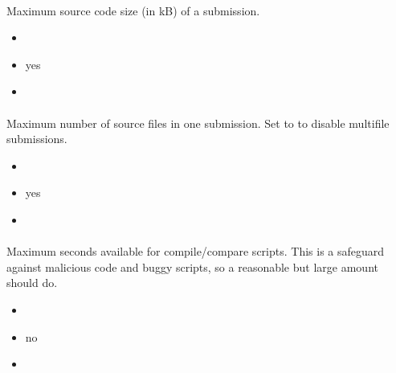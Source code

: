 \documentclass[a4paper,10pt,english,openany]{sphinxmanual}
\begin{document}
\paragraph{}
\label{\detokenize{configuration-reference:sourcesize-limit}}
\sphinxAtStartPar
Maximum source code size (in kB) of a submission.
\begin{itemize}
\item {} 
\sphinxAtStartPar
{} 

\item {} 
\sphinxAtStartPar
{} yes

\item {} 
\sphinxAtStartPar
{} 

\end{itemize}


\paragraph{}
\label{\detokenize{configuration-reference:sourcefiles-limit}}
\sphinxAtStartPar
Maximum number of source files in one submission. Set to  to disable multi\sphinxhyphen{}file submissions.
\begin{itemize}
\item {} 
\sphinxAtStartPar
{} 

\item {} 
\sphinxAtStartPar
{} yes

\item {} 
\sphinxAtStartPar
{} 

\end{itemize}


\paragraph{}
\label{\detokenize{configuration-reference:script-timelimit}}
\sphinxAtStartPar
Maximum seconds available for compile/compare scripts. This is a safeguard against malicious code and buggy scripts, so a reasonable but large amount should do.
\begin{itemize}
\item {} 
\sphinxAtStartPar
{} 

\item {} 
\sphinxAtStartPar
{} no

\item {} 
\sphinxAtStartPar
{} 

\end{itemize}
\end{document}
